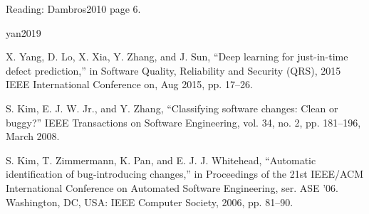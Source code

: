 \documentclass[10pt,journal,compsoc]{IEEEtran}
\begin{document}
Reading: Dambros2010 page 6.


yan2019

X. Yang, D. Lo, X. Xia, Y. Zhang, and J. Sun, “Deep learning for just-in-time defect prediction,” in Software Quality, Reliability and Security (QRS), 2015 IEEE International Conference on, Aug 2015, pp. 17–26.

S. Kim, E. J. W. Jr., and Y. Zhang, “Classifying software changes: Clean or buggy?” IEEE Transactions on Software Engineering, vol. 34, no. 2, pp. 181–196, March 2008.

S. Kim, T. Zimmermann, K. Pan, and E. J. J. Whitehead, “Automatic identification of bug-introducing changes,” in Proceedings of the 21st IEEE/ACM International Conference on Automated Software Engineering, ser. ASE ’06. Washington, DC, USA: IEEE Computer Society, 2006, pp. 81–90.


 

%
%

\end{document}
